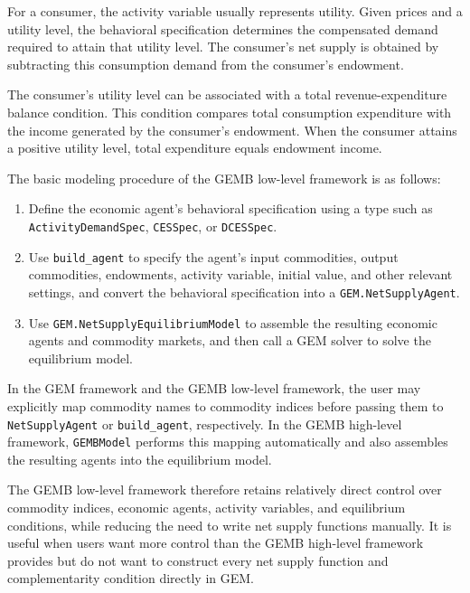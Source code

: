 \documentclass[
  letterpaper,
  DIV=11,
  numbers=noendperiod]{scrreprt}
\begin{document}
For a consumer, the activity variable usually represents utility. Given
prices and a utility level, the behavioral specification determines the
compensated demand required to attain that utility level. The consumer's
net supply is obtained by subtracting this consumption demand from the
consumer's endowment.

The consumer's utility level can be associated with a total
revenue-expenditure balance condition. This condition compares total
consumption expenditure with the income generated by the consumer's
endowment. When the consumer attains a positive utility level, total
expenditure equals endowment income.

The basic modeling procedure of the GEMB low-level framework is as
follows:

\begin{enumerate}
\def\labelenumi{\arabic{enumi}.}
\item
  Define the economic agent's behavioral specification using a type such
  as \texttt{ActivityDemandSpec}, \texttt{CESSpec}, or
  \texttt{DCESSpec}.
\item
  Use \texttt{build\_agent} to specify the agent's input commodities,
  output commodities, endowments, activity variable, initial value, and
  other relevant settings, and convert the behavioral specification into
  a \texttt{GEM.NetSupplyAgent}.
\item
  Use \texttt{GEM.NetSupplyEquilibriumModel} to assemble the resulting
  economic agents and commodity markets, and then call a GEM solver to
  solve the equilibrium model.
\end{enumerate}

In the GEM framework and the GEMB low-level framework, the user may
explicitly map commodity names to commodity indices before passing them
to \texttt{NetSupplyAgent} or \texttt{build\_agent}, respectively. In
the GEMB high-level framework, \texttt{GEMBModel} performs this mapping
automatically and also assembles the resulting agents into the
equilibrium model.

The GEMB low-level framework therefore retains relatively direct control
over commodity indices, economic agents, activity variables, and
equilibrium conditions, while reducing the need to write net supply
functions manually. It is useful when users want more control than the
GEMB high-level framework provides but do not want to construct every
net supply function and complementarity condition directly in GEM.
\end{document}
